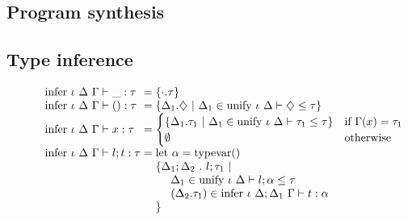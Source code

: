 \documentclass[sigplan,screen]{acmart}
\begin{document}
\subsection{Program synthesis}
\subsection{Type inference}

\begin{figure*}[h]
  \[
    \begin{array}{l @{} l}
      \text{infer } \iota\ \Delta\ \Gamma \vdash 
      \_ : \tau
      &{} =
      \{\cdot.\tau\}
      \\

      \text{infer } \iota\ \Delta\ \Gamma \vdash 
      () : \tau
      &{} =
      \begin{array}[t]{@{} l}
        \{\Delta_1.\diamondsuit\ |
        \ \Delta_1 \in \text{unify } \iota\ \Delta \vdash \diamondsuit \leq \tau
        \}
      \end{array}
      \\

      \text{infer } \iota\ \Delta\ \Gamma \vdash 
      x : \tau
      &{} =
      \begin{cases}  
        \{\Delta_1.\tau_1\ |
        \ \Delta_1 \in \text{unify } \iota\ \Delta \vdash \tau_1 \leq \tau
        \}
        &\text{if } \Gamma(x) = \tau_1
        \\
        \emptyset
        &\text{otherwise}
      \end{cases}
      \\

      \text{infer } \iota\ \Delta\ \Gamma \vdash 
      l ; t : \tau
      &{} =
      \begin{array}[t]{@{} l}
        \text{let } \alpha = \text{typevar}() 
        \\
        \{\Delta_1;\Delta_2\ .\ l ; \tau_1 \ |
        \\
        \ \ \ \ \Delta_1 \in \text{unify } \iota\ \Delta \vdash l ; \alpha \leq \tau
        \\
        \ \ \ \ (\Delta_2.\tau_1) \in \text{infer } \iota\ \Delta;\Delta_1\ \Gamma \vdash t : \alpha
        \\
        \}
      \end{array}
      \\


\end{array}\]
\end{figure*}
\end{document}
